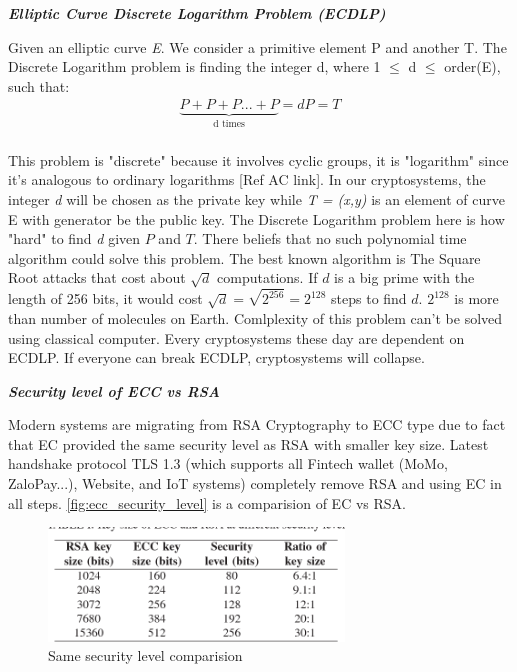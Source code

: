 \bigskip
{\textit {\textbf{Elliptic Curve Discrete Logarithm Problem (ECDLP)}}}
\begin{definition}
  Given an elliptic curve \emph{E}. We consider a primitive element P and another T. The Discrete Logarithm problem is finding the integer d, where 1 $\leq$ d $\leq$ order(E), such that: \medskip
  \begin{align*}
    \underbrace{P + P + P ... + P}_\text{d times} = dP = T \\
  \end{align*}
\end{definition}

This problem is "discrete" because it involves cyclic groups, it is "logarithm" since it's analogous to ordinary logarithms [Ref AC link].
In our cryptosystems, the integer \emph{d} will be chosen as the private key while \emph{T = (x,y)} is an element of curve E with generator be the public key.
The Discrete Logarithm problem here is how "hard" to find \emph{d} given $P$ and $T$.
There beliefs that no such polynomial time algorithm could solve this problem.
The best known algorithm is The Square Root attacks that cost about $\sqrt{d}$ computations.
If $d$ is a big prime with the length of 256 bits, it would cost $\sqrt{d} = \sqrt{2^{256}} = 2^{128}$ steps to find $d$.
$2^{128}$ is more than number of molecules on Earth.
Comlplexity of this problem can't be solved using classical computer.
Every cryptosystems these day are dependent on ECDLP.
If everyone can break ECDLP, cryptosystems will collapse.

\bigskip
{\textit {\textbf{Security level of ECC vs RSA}}}

Modern systems are migrating from RSA Cryptography to ECC type due to fact that EC provided the same security level as RSA with smaller key size.
Latest handshake protocol TLS 1.3 (which supports all Fintech wallet (MoMo, ZaloPay...), Website, and IoT systems) completely remove RSA and using EC in all steps.
\autoref{fig:ecc_security_level} is a comparision of EC vs RSA.

\begin{figure}[ht!]
  \centering
  \includegraphics[width=0.7\textwidth]{images/ecc_security_level.png}
  \caption[EC vs RSA]{Same security level comparision}
  \label{fig:ecc_security_level}
\end{figure}

